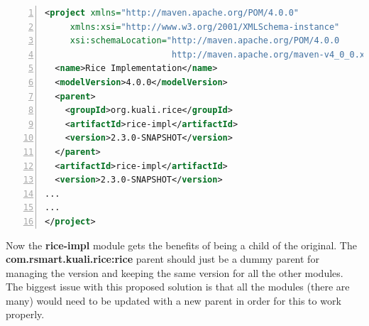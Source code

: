 \documentclass[12pt,notitlepage]{article}
\begin{document}
\newpage 
\begin{lstlisting}[numbers=left,language=xml,basicstyle=\scriptsize,backgroundcolor=\color{ubergray},caption={Custom Impl Module Alternative Parent Definition},frame=single,breaklines=true]
<project xmlns="http://maven.apache.org/POM/4.0.0" 
     xmlns:xsi="http://www.w3.org/2001/XMLSchema-instance" 
     xsi:schemaLocation="http://maven.apache.org/POM/4.0.0 
                         http://maven.apache.org/maven-v4_0_0.xsd">
  <name>Rice Implementation</name>
  <modelVersion>4.0.0</modelVersion>
  <parent>
    <groupId>org.kuali.rice</groupId>
    <artifactId>rice-impl</artifactId>
    <version>2.3.0-SNAPSHOT</version>
  </parent>
  <artifactId>rice-impl</artifactId>
  <version>2.3.0-SNAPSHOT</version>
...
...
</project>
  \end{lstlisting}

Now the \textbf{rice-impl} module gets the benefits of being a child of the original. The \textbf{com.rsmart.kuali.rice:rice} parent should just be a dummy parent for managing the version and keeping the same version for all the other modules. The biggest issue with this proposed solution is that all the modules (there are many) would need to be updated with a new parent in order for this to work properly.
\end{document}
